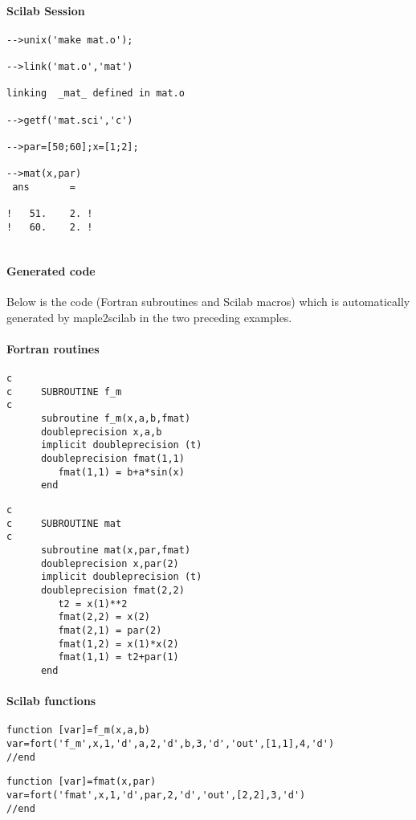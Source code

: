 \paragraph{Scilab Session}
\begin{verbatim}
-->unix('make mat.o');

-->link('mat.o','mat') 

linking  _mat_ defined in mat.o  
 
-->getf('mat.sci','c')

-->par=[50;60];x=[1;2];
 
-->mat(x,par)
 ans       =
 
!   51.    2. !
!   60.    2. !
 
\end{verbatim}

{\small
\paragraph{Generated code}
Below is the code (Fortran subroutines and Scilab macros) which is 
automatically generated by maple2scilab in the two preceding  examples.
\paragraph{Fortran routines}
\begin{verbatim}
c      
c     SUBROUTINE f_m
c      
      subroutine f_m(x,a,b,fmat)
      doubleprecision x,a,b
      implicit doubleprecision (t)
      doubleprecision fmat(1,1)
         fmat(1,1) = b+a*sin(x)
      end
\end{verbatim}
\begin{verbatim}
c      
c     SUBROUTINE mat
c      
      subroutine mat(x,par,fmat)
      doubleprecision x,par(2)
      implicit doubleprecision (t)
      doubleprecision fmat(2,2)
         t2 = x(1)**2
         fmat(2,2) = x(2)
         fmat(2,1) = par(2)
         fmat(1,2) = x(1)*x(2)
         fmat(1,1) = t2+par(1)
      end
\end{verbatim}
\paragraph{Scilab functions}
\begin{verbatim}
function [var]=f_m(x,a,b)
var=fort('f_m',x,1,'d',a,2,'d',b,3,'d','out',[1,1],4,'d')
//end
\end{verbatim}
\begin{verbatim}
function [var]=fmat(x,par)
var=fort('fmat',x,1,'d',par,2,'d','out',[2,2],3,'d')
//end
\end{verbatim}
}
%



